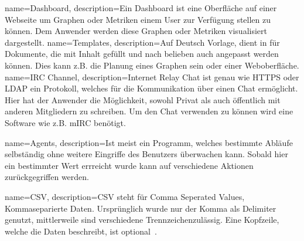 {
  name=Dashboard,
  description={Ein Dashboard ist eine Oberfläche auf einer Webseite um Graphen
              oder Metriken einem User zur Verfügung stellen zu können. Dem
              Anwender werden diese Graphen oder Metriken visualisiert dargestellt.}
}
{
  name=Templates,
  description={Auf Deutsch Vorlage, dient in für Dokumente, die mit Inhalt gefüllt
              und nach belieben auch angepasst werden können. Dies kann z.B. die
              Planung eines Graphen sein oder einer Weboberfläche.}
}
{
  name=IRC Channel,
  description={Internet Relay Chat ist genau wie \gls{HTTPS} oder \gls{LDAP}
              ein Protokoll, welches für die Kommunikation über einen Chat
              ermöglicht. Hier hat der Anwender die Möglichkeit, sowohl
              Privat als auch öffentlich mit anderen Mitgliedern zu schreiben.
              Um den Chat verwenden zu können wird eine Software wie z.B.
              mIRC benötigt.}
}
{
  name=Agents,
  description={Ist meist ein Programm, welches bestimmte Abläufe selbständig
              ohne weitere Eingriffe des Benutzers überwachen kann. Sobald
              hier ein bestimmter Wert errreicht wurde kann auf
              verschiedene Aktionen zurückgegriffen werden.}


}
{
  name=CSV,
  description={CSV steht für Comma Seperated Values, Kommaseparierte Daten.
              Ursprünglich wurde nur der Komma als Delimiter genutzt,
              mittlerweile sind verschiedene Trennzeichenzulässig. Eine
              Kopfzeile, welche die Daten beschreibt, ist optional~\cite{RFC4180}.}
}
